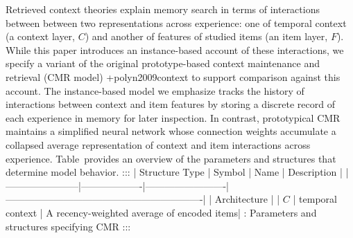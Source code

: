 Retrieved context theories explain memory search in terms of interactions between between two representations across experience: one of temporal context (a context layer, $C$) and another of features of studied items (an item layer, $F$). While this paper introduces an instance-based account of these interactions, we specify a variant of the original prototype-based context maintenance and retrieval (CMR model) +{}{}{polyn2009context} to support comparison against this account. The instance-based model we emphasize tracks the history of interactions between context and item features by storing a discrete record of each experience in memory for later inspection. In contrast, prototypical CMR maintains a simplified neural network whose connection weights accumulate a collapsed average representation of context and item interactions across experience. Table provides an overview of the parameters and structures that determine model behavior.\markdownRendererInterblockSeparator
{}::: | Structure Type | Symbol | Name | Description | |-----------------------|-------------------|-------------------------| -------------------------------------------------------------| | Architecture |\markdownRendererLineBreak
{}| $C$ | temporal context | A recency-weighted average of encoded items| \markdownRendererInterblockSeparator
{}: Parameters and structures specifying CMR :::\relax